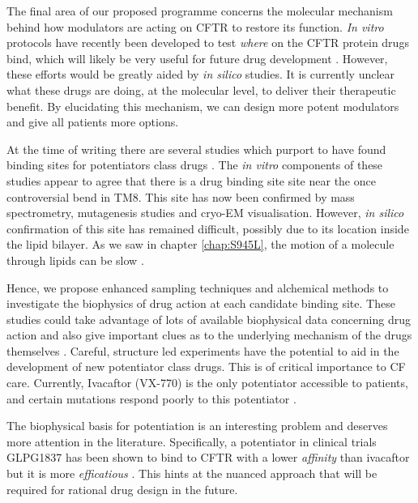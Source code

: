 The final area of our proposed programme concerns the molecular mechanism behind how modulators are acting on CFTR to restore its function. \textit{In vitro} protocols have recently been developed to test \textit{where} on the CFTR protein drugs bind, which will likely be very useful for future drug development \cite{laselva2022}. However, these efforts would be greatly aided by \textit{in silico} studies. It is currently unclear what these drugs are doing, at the molecular level, to deliver their therapeutic benefit. By elucidating this mechanism, we can design more potent modulators and give all patients more options. 

At the time of writing there are several studies which purport to have found binding sites for potentiators class drugs \cite{yeh2019, laselva2021a, liu2019, baatallah2021}. The \textit {in vitro} components of these studies appear to agree that there is a drug binding site site near the once controversial bend in TM8. This site has now been confirmed by mass spectrometry, mutagenesis studies and cryo-EM visualisation. However, \textit{in silico} confirmation of this site has remained difficult, possibly due to its location inside the lipid bilayer. As we saw in chapter \ref{chap:S945L}, the motion of a molecule through lipids can be slow \cite{laselva2021a}. 

Hence, we propose enhanced sampling techniques and alchemical methods to investigate the biophysics of drug action at each candidate binding site. These studies could take advantage of lots of available biophysical data concerning drug action and also give important clues as to the underlying mechanism of the drugs themselves \cite{yeh2017, yeh2019,csanady2019}. Careful, structure led experiments have the potential to aid in the development of new potentiator class drugs. This is of critical importance to CF care. Currently, Ivacaftor (VX-770) is the only potentiator accessible to patients, and certain mutations respond poorly to this potentiator \cite{phuan2018, vangoor2014}. 

The biophysical basis for potentiation is an interesting problem and deserves more attention in the literature. Specifically, a potentiator in clinical trials GLPG1837 has been shown to bind to CFTR with a lower \textit{affinity} than ivacaftor but it is more \textit{efficatious} \cite{yeh2019, yeh2017,vanderplas2018}. This hints at the nuanced approach that will be required for rational drug design in the future. 

